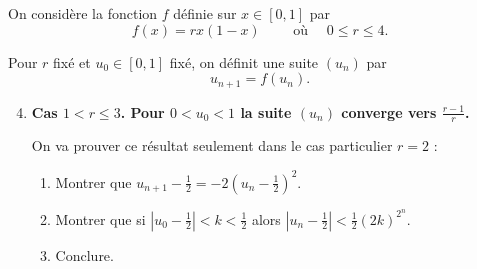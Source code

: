 \begin{frame}
\begin{tp}
On considère la fonction $f$ définie sur $x \in [0,1]$ par 
$$f(x)=rx(1-x) \qquad \text{ où } \quad 0 \le  r \le 4.$$

Pour $r$ fixé et $u_0 \in [0,1]$ fixé, on définit une suite $(u_n)$ par
$$u_{n+1} = f(u_n).$$

\begin{enumerate}
\setcounter{enumi}{3} 
\item \textbf{Cas $1 < r \le3$. Pour $0<u_0<1$ la suite $(u_n)$ converge vers $\frac{r-1}{r}$.}
 
  On va prouver ce résultat seulement dans le cas particulier $r=2$ :
  \begin{enumerate}
    \item Montrer que $u_{n+1}-\frac12 = -2\left(u_n-\frac12\right)^2$.
    \item Montrer que si $|u_0-\frac12| < k < \frac12$ alors 
    $|u_n-\frac12| < \frac12 (2k)^{2^n}$.
    \item Conclure.
  \end{enumerate} 

  \end{enumerate}
\end{tp}
\end{frame}





